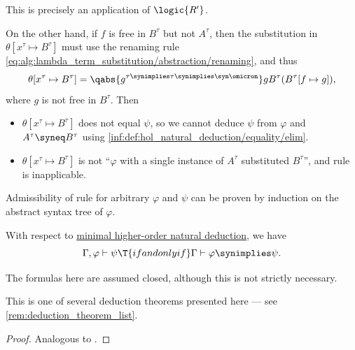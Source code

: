 \begin{example}
  This is precisely an application of \( \logic{R'} \).

  On the other hand, if \( f \) is free in \( B^\tau \) but not \( A^\tau \), then the substitution in \( \theta[x^\tau \mapsto B^\tau] \) must use the renaming rule \eqref{eq:alg:lambda_term_substitution/abstraction/renaming}, and thus
  \begin{equation*}
    \theta[x^\tau \mapsto B^\tau] = \qabs {g^{\tau \synimplies \tau \synimplies \syn\omicron}} g B^\tau (B^\tau[f \mapsto g]),
  \end{equation*}
  where \( g \) is not free in \( B^\tau \). Then
  \begin{itemize}
    \item \( \theta[x^\tau \mapsto B^\tau] \) does not equal \( \psi \), so we cannot deduce \( \psi \) from \( \varphi \) and \( A^\tau \syneq B^\tau \) using \ref{inf:def:hol_natural_deduction/equality/elim}.

    \item \( \theta[x^\tau \mapsto B^\tau] \) is not \enquote{\( \varphi \) with a single instance of \( A^\tau \) substituted \( B^\tau \)}, and rule  is inapplicable.
  \end{itemize}

  Admissibility of rule  for arbitrary \( \varphi \) and \( \psi \) can be proven by induction on the abstract syntax tree of \( \varphi \).
\end{example}

\begin{theorem}\label{thm:hol_syntactic_deduction_theorem}
  With respect to \hyperref[def:fol_natural_deduction]{minimal higher-order natural deduction}, we have
  \begin{equation*}
    \Gamma, \varphi \vdash \psi \T{if and only if} \Gamma \vdash \varphi \synimplies \psi.
  \end{equation*}
\end{theorem}
\begin{comments}
  \item The formulas here are assumed closed, although this is not strictly necessary.
  \item This is one of several deduction theorems presented here --- see \cref{rem:deduction_theorem_list}.
\end{comments}
\begin{proof}
  Analogous to .
\end{proof}

